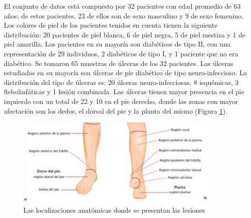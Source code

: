 El conjunto de datos está compuesto por 32 pacientes con edad promedio de 63 años; de estos pacientes, 23 de ellos son de sexo masculino y 9 de sexo femenino. Los colores de piel de los pacientes tenidos en cuenta tienen la siguiente distribución: 20 pacientes de piel blanca, 6 de piel negra, 5 de piel mestiza y 1 de piel amarilla. Los pacientes en su mayoría son diabéticos de tipo II, con una representación de 29 individuos, 2 diabéticos de tipo I, y 1 paciente que no era diabético. Se tomaron 65 muestras de úlceras de los 32 pacientes. Las úlceras estudiadas en su mayoría son úlceras de pie diabético de tipo neuro-infeccioso. La distribución del tipo de úlceras es: 20 úlceras neuro-infecciosas, 8 isquémicas, 3 flebolinfáticas y 1 lesión combinada. Las úlceras tienen mayor presencia en el pie izquierdo con un total de 22 y 10 en el pie derecho, donde las zonas con mayor afectación son los dedos, el dorsal del pie y la planta del mismo (Figura \ref{fig:loc}).

\begin{figure}[ht]
	\centering
	\includegraphics[width=10cm]{./Graphics/human.png}
	\caption{Las localizaciones anatómicas donde se presentan las lesiones}
	\label{fig:loc}
\end{figure}

